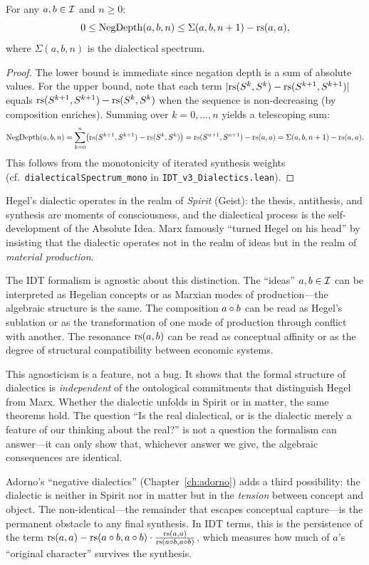 \begin{theorem}
\label{thm:negation-depth-bounds}
For any $a, b \in \mathcal{I}$ and $n \geq 0$:
\[
0 \leq \mathrm{NegDepth}(a, b, n) \leq \Sigma(a, b, n+1) - \mathrm{rs}(a,a),
\]
where $\Sigma(a,b,n)$ is the dialectical spectrum.
\end{theorem}

\begin{proof}
The lower bound is immediate since negation depth is a sum of absolute values.
For the upper bound, note that each term $|\mathrm{rs}(S^k, S^k) - \mathrm{rs}(S^{k+1}, S^{k+1})|$
equals $\mathrm{rs}(S^{k+1}, S^{k+1}) - \mathrm{rs}(S^k, S^k)$ when the sequence is non-decreasing
(by composition enriches). Summing over $k = 0, \ldots, n$ yields a telescoping sum:
\[
\mathrm{NegDepth}(a,b,n) = \sum_{k=0}^{n} \bigl(\mathrm{rs}(S^{k+1}, S^{k+1}) - \mathrm{rs}(S^k, S^k)\bigr)
= \mathrm{rs}(S^{n+1}, S^{n+1}) - \mathrm{rs}(a, a) = \Sigma(a,b,n+1) - \mathrm{rs}(a,a).
\]
This follows from the monotonicity of iterated synthesis weights
(cf.\ \texttt{dialecticalSpectrum\_mono} in \texttt{IDT\_v3\_Dialectics.lean}).
\end{proof}

\begin{remark}
Hegel's dialectic operates in the realm of \emph{Spirit} (Geist): the thesis,
antithesis, and synthesis are moments of consciousness, and the dialectical
process is the self-development of the Absolute Idea. Marx famously ``turned
Hegel on his head'' by insisting that the dialectic operates not in the realm
of ideas but in the realm of \emph{material production}.

The IDT formalism is agnostic about this distinction. The ``ideas'' $a, b \in \mathcal{I}$
can be interpreted as Hegelian concepts or as Marxian modes of production---the
algebraic structure is the same. The composition $a \circ b$ can be read as
Hegel's sublation or as the transformation of one mode of production through
conflict with another. The resonance $\mathrm{rs}(a,b)$ can be read as conceptual
affinity or as the degree of structural compatibility between economic systems.

This agnosticism is a feature, not a bug. It shows that the formal structure
of dialectics is \emph{independent} of the ontological commitments that
distinguish Hegel from Marx. Whether the dialectic unfolds in Spirit or in
matter, the same theorems hold. The question ``Is the real dialectical, or is
the dialectic merely a feature of our thinking about the real?'' is not a
question the formalism can answer---it can only show that, whichever answer we
give, the algebraic consequences are identical.

Adorno's ``negative dialectics'' (Chapter~\ref{ch:adorno}) adds a third
possibility: the dialectic is neither in Spirit nor in matter but in the
\emph{tension} between concept and object. The non-identical---the remainder
that escapes conceptual capture---is the permanent obstacle to any final
synthesis. In IDT terms, this is the persistence of the term
$\mathrm{rs}(a,a) - \mathrm{rs}(a \circ b, a \circ b) \cdot \frac{\mathrm{rs}(a,a)}{\mathrm{rs}(a \circ b, a \circ b)}$,
which measures how much of $a$'s ``original character'' survives the synthesis.
\end{remark}

